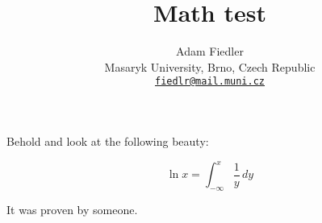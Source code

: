 \documentclass[a4paper]{article}
\title{
    Math test
}
\author{
    Adam Fiedler\\
    \small
    Masaryk University, Brno, Czech Republic\\
    \small
    \texttt{\href{mailto:fiedlr@mail.muni.cz}{fiedlr@mail.muni.cz}}
}
\date{}
\begin{document}
\maketitle

Behold and look at the following beauty:

$$ \ln x = \int_{-\infty}^x \frac 1 y \, dy  $$

It was proven by someone\cite{someone}.
\end{document}
